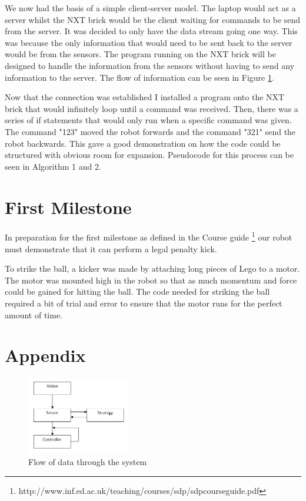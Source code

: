 \documentclass[conference,12pt]{IEEEtran}
\begin{document}
We now had the basis of a simple client-server model. The laptop would act as a server whilst the NXT brick would be the client waiting for commands to be send from the server. It was decided to only have the data stream going one way. This was because the only information that would need to be sent back to the server would be from the sensors. The program running on the NXT brick will be designed to handle the information from the sensors without having to send any information to the server. The flow of information can be seen in Figure \ref{fig:dataFlow}.

Now that the connection was established I installed a program onto the NXT brick that would infinitely loop until a command was received. Then, there was a series of if statements that would only run when a specific command was given. The command "123" moved the robot forwards and the command "321" send the robot backwards. This gave a good demonstration on how the code could be structured with obvious room for expansion. Pseudocode for this process can be seen in Algorithm 1 and 2.

\section{First Milestone}
In preparation for the first milestone as defined in the Course guide \footnote{http://www.inf.ed.ac.uk/teaching/courses/sdp/sdp\-course\-guide.pdf} our robot must demonstrate that it can perform a legal penalty kick. 

To strike the ball, a kicker was made by attaching long pieces of Lego to a motor. The motor was mounted high in the robot so that as much momentum and force could be gained for hitting the ball. The code needed for striking the ball required a bit of trial and error to ensure that the motor runs for the perfect amount of time.

\pagebreak

\section{Appendix}

\begin{figure}[htp]
\begin{center}
\includegraphics[width=0.4\textwidth] {flowchart.jpg}
\end{center}
\caption{Flow of data through the system}
\label{fig:dataFlow}
\end{figure}
\end{document}
